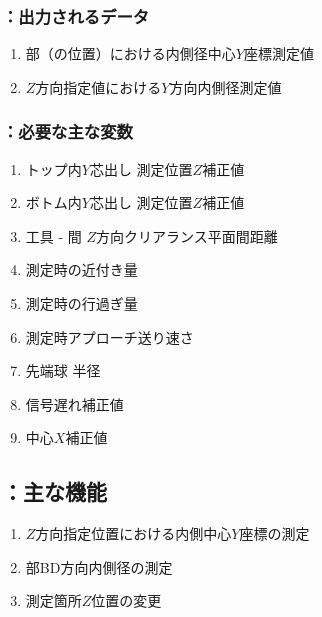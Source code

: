 \subsubsection{\MYIWidth：出力されるデータ}
\begin{enumerate}[label*=\sarrow]
\item \EndFace 部（\ReAlocationLength の位置）における内側径中心$Y$座標測定値
\item $Z$方向指定値における$Y$方向内側径測定値
\end{enumerate}

\subsubsection{\MYIWidth：必要な主な変数}
\begin{enumerate}[label*=\sarrow]
\item トップ内$Y$芯出し 測定位置$Z$補正値
\item ボトム内$Y$芯出し 測定位置$Z$補正値
\item 工具 - \EndFace 間 $Z$方向クリアランス平面間距離
\item \TouchSensorProbe 測定時の近付き量
\item \TouchSensorProbe 測定時の行過ぎ量
\item \TouchSensorProbe 測定時アプローチ送り速さ
\item \TouchSensorProbe 先端球 半径
\item \TouchSensorProbe 信号遅れ補正値
\item \TouchSensorProbe 中心$X$補正値
\end{enumerate}


\subsection{\MYIWidth：主な機能}
\begin{enumerate}[label*=\sarrow]
\item $Z$方向指定位置における内側中心$Y$座標の測定
\item \EndFace 部BD方向内側径の測定
\item 測定箇所$Z$位置の変更
\end{enumerate}


